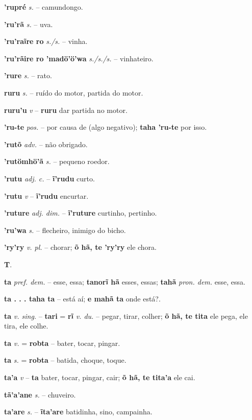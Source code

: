 \textbf{'rupré} \textit{s.} -- camundongo.

\textbf{'ru'rã} \textit{s.} -- uva.

\textbf{'ru'raĩre ro} \textit{s./s.} -- vinha.

\textbf{'ru'rãire ro 'madö'ö'wa} \textit{s./s./s.} -- vinhateiro.

\textbf{'rure} \textit{s.} -- rato.

\textbf{ruru} \textit{s.} -- ruído do motor, partida do motor.

\textbf{ruru'u} \textit{v} -- \textbf{ruru} dar partida no motor.

\textbf{'ru-te} \textit{pos.} -- por causa de (algo negativo); \textbf{taha 'ru-te} por isso.

\textbf{'rutõ} \textit{adv.} -- não obrigado.

\textbf{'rutömhö'ã} \textit{s.} -- pequeno roedor.

\textbf{'rutu} \textit{adj. c.} -- \textbf{ĩ'rudu} curto.

\textbf{'rutu} \textit{v} -- \textbf{ĩ'rudu} encurtar.

\textbf{'ruture} \textit{adj. dim.} -- \textbf{ĩ'ruture} curtinho, pertinho.

\textbf{'ru'wa} \textit{s.} -- flecheiro, inimigo do bicho.

\textbf{'ry'ry} \textit{v. pl.} -- chorar; \textbf{õ hã, te 'ry'ry} ele chora.



\textbf{T}.



\textbf{ta} \textit{pref. dem.} -- esse, essa; \textbf{tanorĩ hã} esses, essas; \textbf{tahã} \textit{pron. dem.} esse, essa.

\textbf{ta . . . taha ta} \textit{} -- está aí; \textbf{e mahã ta} onde está?.

\textbf{ta} \textit{v. sing.} -- \textbf{tari} = \textbf{rĩ} \textit{v. du.} -- pegar, tirar, colher; \textbf{õ hã, te tita} ele pega, ele tira, ele colhe.

\textbf{ta} \textit{v.} = \textbf{robta} -- bater, tocar, pingar.

\textbf{ta} \textit{s.} = \textbf{robta} -- batida, choque, toque.

\textbf{ta'a} \textit{v} -- \textbf{ta} bater, tocar, pingar, cair; \textbf{õ hã, te tita'a} ele cai.

\textbf{tã'a'ane} \textit{s.} -- chuveiro.

\textbf{ta'are} \textit{s.} -- \textbf{ĩta'are} batidinha, sino, campainha.

